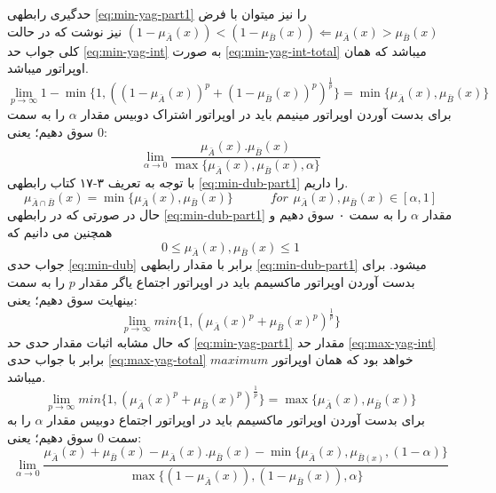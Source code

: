 \documentclass[10pt,a4paper]{article}
\newcommand{\نیمفاصله}{\halfspace}
\renewcommand{\ }{\halfspace}
\newcommand{\mba}{\mu_{\bar{A}}}
\newcommand{\mbb}{\mu_{\bar{B}}}
\begin{document}
حدگیری رابطه\ ی
\ref{eq:min-yag-part1}
را نیز می\ توان با فرض
$(1 - \mba(x)) < (1 - \mbb(x)) \Longleftarrow \mba(x) > \mbb(x)$
نیز نوشت که در حالت کلی جواب حد
\ref{eq:min-yag-int}
به صورت
\ref{eq:min-yag-int-total}
می\ باشد که همان اوپراتور
می\ باشد.
\begin{equation}
\lim_{p \rightarrow \infty} 1 - \min\{1, ((1-\mba(x))^p + (1-\mbb(x))^p)^{\frac{1}{p}}\} = \min\{\mba(x), \mbb(x)\}
\label{eq:min-yag-int-total}
\end{equation}
برای بدست آوردن اوپراتور مینیمم باید در اوپراتور اشتراک دوبیس مقدار $\alpha$ را به سمت 0 سوق دهیم؛ یعنی:
\begin{equation}
\lim_{\alpha \rightarrow 0} \frac{\mba(x).\mbb(x)}{\max\{\mba(x), \mbb(x), \alpha\}}
\label{eq:min-dub}
\end{equation}
با توجه به تعریف ۳-۱۷ کتاب\
\cite{ZIM}
رابطه\ ی
\ref{eq:min-dub-part1}
را داریم.
\begin{equation}
\mu_{\bar{A} \cap \bar{B}}(x) = \min\{\mba(x), \mbb(x)\}\hspace{3em}for\hspace{5pt}\mba(x), \mbb(x) \in [\alpha, 1]
\label{eq:min-dub-part1}
\end{equation}
حال در صورتی که در رابطه\ ی
\ref{eq:min-dub-part1}
مقدار $\alpha$ را به سمت ۰ سوق دهیم و همچنین می دانیم که
\[0 \leq \mba(x) , \mbb(x) \leq 1\]
جواب حدی
\ref{eq:min-dub}
برابر با مقدار رابطه\ ی
\ref{eq:min-dub-part1}
می\ شود.
برای بدست آوردن اوپراتور ماکسیمم باید در اوپراتور اجتماع یاگر مقدار $p$ را به سمت بی\ نهایت سوق دهیم؛ یعنی:
\begin{equation}
\lim_{p \rightarrow \infty} min\{1, (\mba(x)^p + \mbb(x)^p) ^ {\frac{1}{p}}\}
\label{eq:max-yag-int}
\end{equation}
که حال مشابه اثبات مقدار حدی حد
\ref{eq:min-yag-part1}
مقدار حد
\ref{eq:max-yag-int}
برابر با جواب حدی
\ref{eq:max-yag-total}
خواهد بود که همان اوپراتور $maximum$ می\ باشد.
\begin{equation}
\lim_{p \rightarrow \infty} min\{1, (\mba(x)^p + \mbb(x)^p) ^ {\frac{1}{p}}\} = \max\{\mba(x) , \mbb(x)\}
\label{eq:max-yag-total}
\end{equation}
برای بدست آوردن اوپراتور ماکسیمم باید در اوپراتور اجتماع دوبیس مقدار $\alpha$ را به سمت 0 سوق دهیم؛ یعنی:
\begin{equation}
\lim_{\alpha \rightarrow 0} \frac{\mba(x) + \mbb(x) - \mba(x).\mbb(x) - \min\{\mba(x), \mu_{\bar{B}(x)}, (1-\alpha)\}}{\max\{(1-\mba(x)), (1-\mbb(x)), \alpha\}}
\label{eq:max-dub}
\end{equation}
\end{document}
